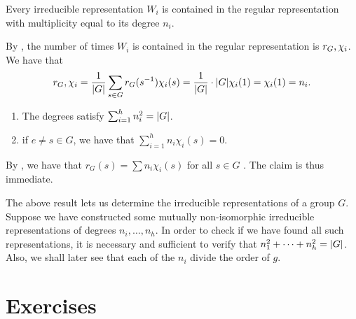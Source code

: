 \documentclass[letterpaper, 11pt, oneside]{book}
\begin{document}
\clearpage

\begin{cor}\label{cor:char_reg_rep_cor_1}
  Every irreducible representation $W_{i}$ is contained in the regular representation with multiplicity equal to its degree $n_{i}$.
\end{cor}
\begin{pf}
  By , the number of times $W_{i}$ is contained in the regular representation is $\inner{r_{G}, \chi_{i}}$.
  We have that
  \[
    \inner{r_{G}, \chi_{i}} = \frac{1}{\abs{G}} \sum_{s \in G} r_{G}(s^{-1}) \chi_{i}(s) = \frac{1}{\abs{G}} \cdot \abs{G} \chi_{i}(1) = \chi_{i}(1) = n_{i}.
  \]
\end{pf}

\begin{cor}\label{cor:char_reg_rep_cor_2}
  \begin{enumerate}
  \item The degrees satisfy $\sum_{i = 1}^{h} n_{i}^{2} = \abs{G}$.
  \item if $e \neq s \in G$, we have that $\sum_{i = 1}^{h} n_{i} \chi_{i}(s) = 0$.
  \end{enumerate}
\end{cor}
\begin{pf}
  By , we have that $r_{G}(s) = \sum n_{i} \chi_{i}(s)$ for all $s \in G$ .
  The claim is thus immediate.
\end{pf}

The above result lets us determine the irreducible representations of a group $G$.
Suppose we have constructed some mutually non-isomorphic irreducible representations of degrees $n_{i}, \ldots, n_{h}$.
In order to check if we have found all such representations, it is necessary and sufficient to verify that $n_{1}^{2} + \cdots + n_{h}^{2} = \abs{G}$.
Also, we shall later see that each of the $n_{i}$ divide the order of $g$.

\clearpage

\section*{Exercises}
\end{document}
